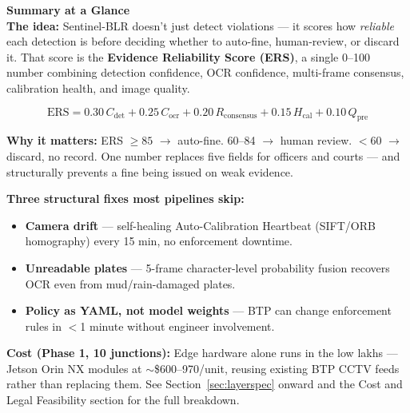 \documentclass[11pt,a4paper]{article}
\begin{document}
\vspace{2em}
\begin{callout}
{\Large\bfseries\color{sentinelblue} Summary at a Glance}\\[0.6em]

\textbf{The idea:} Sentinel-BLR doesn't just detect violations --- it scores how \textit{reliable} each detection is before deciding whether to auto-fine, human-review, or discard it. That score is the \textbf{Evidence Reliability Score (ERS)}, a single 0--100 number combining detection confidence, OCR confidence, multi-frame consensus, calibration health, and image quality.

\vspace{0.4em}
\begin{equation*}
\text{ERS} = 0.30\,C_{\text{det}} + 0.25\,C_{\text{ocr}} + 0.20\,R_{\text{consensus}} + 0.15\,H_{\text{cal}} + 0.10\,Q_{\text{pre}}
\end{equation*}
\vspace{0.2em}

\textbf{Why it matters:} ERS $\geq 85$ $\rightarrow$ auto-fine. 60--84 $\rightarrow$ human review. $<60$ $\rightarrow$ discard, no record. One number replaces five fields for officers and courts --- and structurally prevents a fine being issued on weak evidence.

\textbf{Three structural fixes most pipelines skip:}
\begin{itemize}[leftmargin=1.5em, itemsep=0.15em, topsep=0.2em]
    \item \textbf{Camera drift} --- self-healing Auto-Calibration Heartbeat (SIFT/ORB homography) every 15 min, no enforcement downtime.
    \item \textbf{Unreadable plates} --- 5-frame character-level probability fusion recovers OCR even from mud/rain-damaged plates.
    \item \textbf{Policy as YAML, not model weights} --- BTP can change enforcement rules in $<$1 minute without engineer involvement.
\end{itemize}

\textbf{Cost (Phase 1, 10 junctions):} Edge hardware alone runs in the low lakhs --- Jetson Orin NX modules at $\sim$\$600--970/unit, reusing existing BTP CCTV feeds rather than replacing them. See Section~\ref{sec:layerspec} onward and the Cost and Legal Feasibility section for the full breakdown.


\end{callout}
\end{document}
